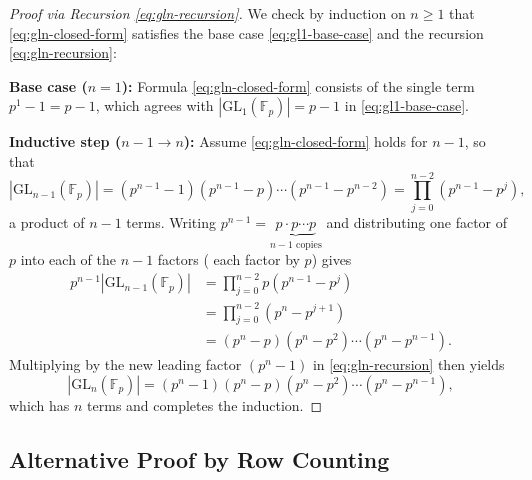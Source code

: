 \begin{content}

\begin{proof}[Proof via Recursion \eqref{eq:gln-recursion}]
We check by induction on $n \ge 1$ that \eqref{eq:gln-closed-form} satisfies the base case \eqref{eq:gl1-base-case} and the recursion \eqref{eq:gln-recursion}:

\textbf{Base case ($n = 1$):} Formula \eqref{eq:gln-closed-form} consists of the single term $p^1 - 1 = p - 1$, which agrees with $\left|\mathrm{GL}_1(\mathbb{F}_p)\right| = p - 1$ in \eqref{eq:gl1-base-case}.

\textbf{Inductive step ($n - 1 \to n$):} Assume \eqref{eq:gln-closed-form} holds for $n - 1$, so that
\[
\left|\mathrm{GL}_{n-1}(\mathbb{F}_p)\right| = (p^{n-1} - 1)(p^{n-1} - p) \cdots (p^{n-1} - p^{n-2}) = \prod_{j=0}^{n-2} (p^{n-1} - p^j),
\]
a product of $n - 1$ terms. Writing $p^{n-1} = \underbrace{p \cdot p \cdots p}_{n-1\text{ copies}}$ and distributing one factor of $p$ into each of the $n - 1$ factors ( each factor by $p$) gives
\begin{align*}
p^{n-1} \left|\mathrm{GL}_{n-1}(\mathbb{F}_p)\right| &= \prod_{j=0}^{n-2} p(p^{n-1} - p^j) \\
&= \prod_{j=0}^{n-2} (p^n - p^{j+1}) \\
&= (p^n - p)(p^n - p^2) \cdots (p^n - p^{n-1}).
\end{align*}
Multiplying by the new leading factor $(p^n - 1)$ in \eqref{eq:gln-recursion} then yields
\[
\left|\mathrm{GL}_n(\mathbb{F}_p)\right| = (p^n - 1)(p^n - p)(p^n - p^2) \cdots (p^n - p^{n-1}),
\]
which has $n$ terms and completes the induction.
\end{proof}
\end{content}

\subsection{Alternative Proof by Row Counting}


